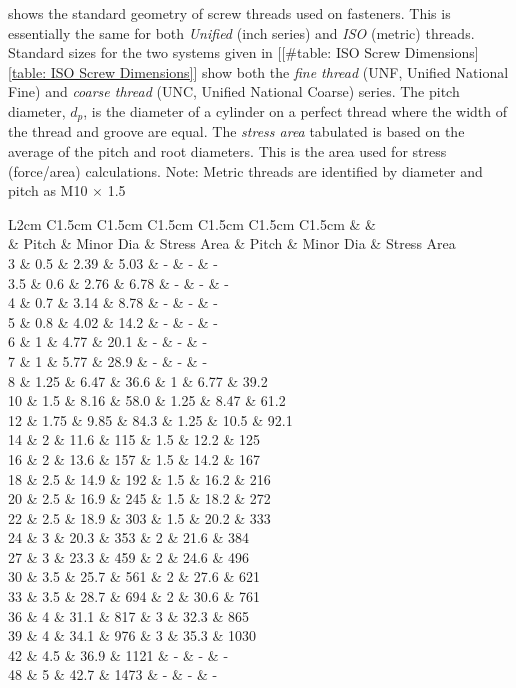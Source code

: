 \documentclass[a4paper,openany,12pt]{book}
\begin{document}
{{shows the standard geometry of screw threads used on fasteners. This is
essentially the same for both \emph{Unified} (inch series) and \emph{ISO} (metric)
threads. Standard sizes for the two systems given in
[[\#table: ISO Screw Dimensions]\ref{table: ISO Screw Dimensions}] show
both the \emph{fine thread} (UNF, Unified National Fine) and \emph{coarse thread}
(UNC, Unified National Coarse) series. The pitch diameter, \(d_p\), is the
diameter of a cylinder on a perfect thread where the width of the thread
and groove are equal. The \emph{stress area} tabulated is based on the
average of the pitch and root diameters. This is the area used for
stress (force/area) calculations. Note: Metric threads are identified by
diameter and pitch as M10 \(\times\) 1.5


 L2cm C1.5cm C1.5cm C1.5cm C1.5cm C1.5cm C1.5cm \& \&\\
\& Pitch \& Minor Dia \& Stress Area \& Pitch \& Minor Dia \& Stress Area\\
3 \& 0.5 \& 2.39 \& 5.03 \& - \& - \& -\\
3.5 \& 0.6 \& 2.76 \& 6.78 \& - \& - \& -\\
4 \& 0.7 \& 3.14 \& 8.78 \& - \& - \& -\\
5 \& 0.8 \& 4.02 \& 14.2 \& - \& - \& -\\
6 \& 1 \& 4.77 \& 20.1 \& - \& - \& -\\
7 \& 1 \& 5.77 \& 28.9 \& - \& - \& -\\
8 \& 1.25 \& 6.47 \& 36.6 \& 1 \& 6.77 \& 39.2\\
10 \& 1.5 \& 8.16 \& 58.0 \& 1.25 \& 8.47 \& 61.2\\
12 \& 1.75 \& 9.85 \& 84.3 \& 1.25 \& 10.5 \& 92.1\\
14 \& 2 \& 11.6 \& 115 \& 1.5 \& 12.2 \& 125\\
16 \& 2 \& 13.6 \& 157 \& 1.5 \& 14.2 \& 167\\
18 \& 2.5 \& 14.9 \& 192 \& 1.5 \& 16.2 \& 216\\
20 \& 2.5 \& 16.9 \& 245 \& 1.5 \& 18.2 \& 272\\
22 \& 2.5 \& 18.9 \& 303 \& 1.5 \& 20.2 \& 333\\
24 \& 3 \& 20.3 \& 353 \& 2 \& 21.6 \& 384\\
27 \& 3 \& 23.3 \& 459 \& 2 \& 24.6 \& 496\\
30 \& 3.5 \& 25.7 \& 561 \& 2 \& 27.6 \& 621\\
33 \& 3.5 \& 28.7 \& 694 \& 2 \& 30.6 \& 761\\
36 \& 4 \& 31.1 \& 817 \& 3 \& 32.3 \& 865\\
39 \& 4 \& 34.1 \& 976 \& 3 \& 35.3 \& 1030\\
42 \& 4.5 \& 36.9 \& 1121 \& - \& - \& -\\
48 \& 5 \& 42.7 \& 1473 \& - \& - \& -\\

}}
\end{document}
